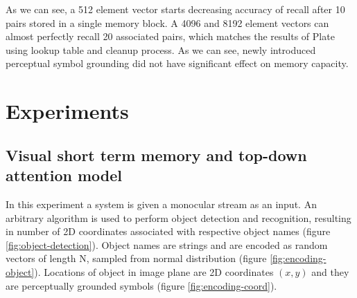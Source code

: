 \documentclass[conference]{IEEEtran}
\begin{document}
	As we can see, a 512 element vector starts decreasing accuracy of recall after 10 pairs stored in a single memory block. A 4096 and 8192 element vectors can almost perfectly recall 20 associated pairs, which matches the results of Plate using lookup table and cleanup process. As we can see, newly introduced perceptual symbol grounding did not have significant effect on memory capacity.
	
	\section{Experiments}
	
	\subsection{Visual short term memory and top-down attention model}
	
	In this experiment a system is given a monocular stream as an input. An arbitrary algorithm is used to perform object detection and recognition, resulting in number of 2D coordinates associated with respective object names (figure \ref{fig:object-detection}). Object names are strings and are encoded as random vectors of length N, sampled from normal distribution (figure \ref{fig:encoding-object}). Locations of object in image plane are 2D coordinates $(x,y)$ and they are perceptually grounded symbols (figure \ref{fig:encoding-coord}).
	
\end{document}
